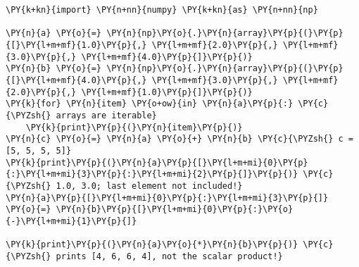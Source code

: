 \begin{Verbatim}[commandchars=\\\{\}]
\PY{k+kn}{import} \PY{n+nn}{numpy} \PY{k+kn}{as} \PY{n+nn}{np}

\PY{n}{a} \PY{o}{=} \PY{n}{np}\PY{o}{.}\PY{n}{array}\PY{p}{(}\PY{p}{[}\PY{l+m+mf}{1.0}\PY{p}{,} \PY{l+m+mf}{2.0}\PY{p}{,} \PY{l+m+mf}{3.0}\PY{p}{,} \PY{l+m+mf}{4.0}\PY{p}{]}\PY{p}{)}
\PY{n}{b} \PY{o}{=} \PY{n}{np}\PY{o}{.}\PY{n}{array}\PY{p}{(}\PY{p}{[}\PY{l+m+mf}{4.0}\PY{p}{,} \PY{l+m+mf}{3.0}\PY{p}{,} \PY{l+m+mf}{2.0}\PY{p}{,} \PY{l+m+mf}{1.0}\PY{p}{]}\PY{p}{)}
\PY{k}{for} \PY{n}{item} \PY{o+ow}{in} \PY{n}{a}\PY{p}{:} \PY{c}{\PYZsh{} arrays are iterable}
    \PY{k}{print}\PY{p}{(}\PY{n}{item}\PY{p}{)}
\PY{n}{c} \PY{o}{=} \PY{n}{a} \PY{o}{+} \PY{n}{b} \PY{c}{\PYZsh{} c = [5, 5, 5, 5]}
\PY{k}{print}\PY{p}{(}\PY{n}{a}\PY{p}{[}\PY{l+m+mi}{0}\PY{p}{:}\PY{l+m+mi}{3}\PY{p}{:}\PY{l+m+mi}{2}\PY{p}{]}\PY{p}{)} \PY{c}{\PYZsh{} 1.0, 3.0; last element not included!}
\PY{n}{a}\PY{p}{[}\PY{l+m+mi}{0}\PY{p}{:}\PY{l+m+mi}{3}\PY{p}{]} \PY{o}{=} \PY{n}{b}\PY{p}{[}\PY{l+m+mi}{0}\PY{p}{:}\PY{o}{-}\PY{l+m+mi}{1}\PY{p}{]}

\PY{k}{print}\PY{p}{(}\PY{n}{a}\PY{o}{*}\PY{n}{b}\PY{p}{)} \PY{c}{\PYZsh{} prints [4, 6, 6, 4], not the scalar product!}
\end{Verbatim}
